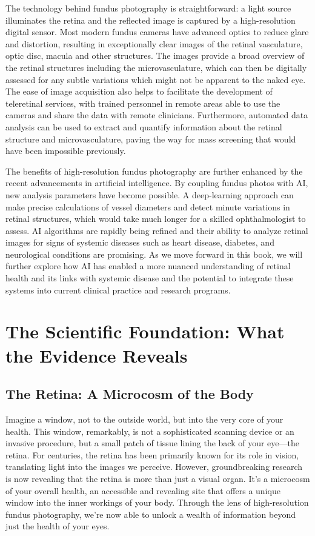 \documentclass[
  Letterpaper,
]{scrbook}
\begin{document}
The technology behind fundus photography is straightforward: a light
source illuminates the retina and the reflected image is captured by a
high-resolution digital sensor. Most modern fundus cameras have advanced
optics to reduce glare and distortion, resulting in exceptionally clear
images of the retinal vasculature, optic disc, macula and other
structures. The images provide a broad overview of the retinal
structures including the microvasculature, which can then be digitally
assessed for any subtle variations which might not be apparent to the
naked eye. The ease of image acquisition also helps to facilitate the
development of teleretinal services, with trained personnel in remote
areas able to use the cameras and share the data with remote clinicians.
Furthermore, automated data analysis can be used to extract and quantify
information about the retinal structure and microvasculature, paving the
way for mass screening that would have been impossible previously.

The benefits of high-resolution fundus photography are further enhanced
by the recent advancements in artificial intelligence. By coupling
fundus photos with AI, new analysis parameters have become possible. A
deep-learning approach can make precise calculations of vessel diameters
and detect minute variations in retinal structures, which would take
much longer for a skilled ophthalmologist to assess. AI algorithms are
rapidly being refined and their ability to analyze retinal images for
signs of systemic diseases such as heart disease, diabetes, and
neurological conditions are promising. As we move forward in this book,
we will further explore how AI has enabled a more nuanced understanding
of retinal health and its links with systemic disease and the potential
to integrate these systems into current clinical practice and research
programs.


\chapter{The Scientific Foundation: What the Evidence
Reveals}\label{the-scientific-foundation-what-the-evidence-reveals}

\section{The Retina: A Microcosm of the
Body}\label{the-retina-a-microcosm-of-the-body}

Imagine a window, not to the outside world, but into the very core of
your health. This window, remarkably, is not a sophisticated scanning
device or an invasive procedure, but a small patch of tissue lining the
back of your eye---the retina. For centuries, the retina has been
primarily known for its role in vision, translating light into the
images we perceive. However, groundbreaking research is now revealing
that the retina is more than just a visual organ. It's a microcosm of
your overall health, an accessible and revealing site that offers a
unique window into the inner workings of your body. Through the lens of
high-resolution fundus photography, we're now able to unlock a wealth of
information beyond just the health of your eyes.
\end{document}
